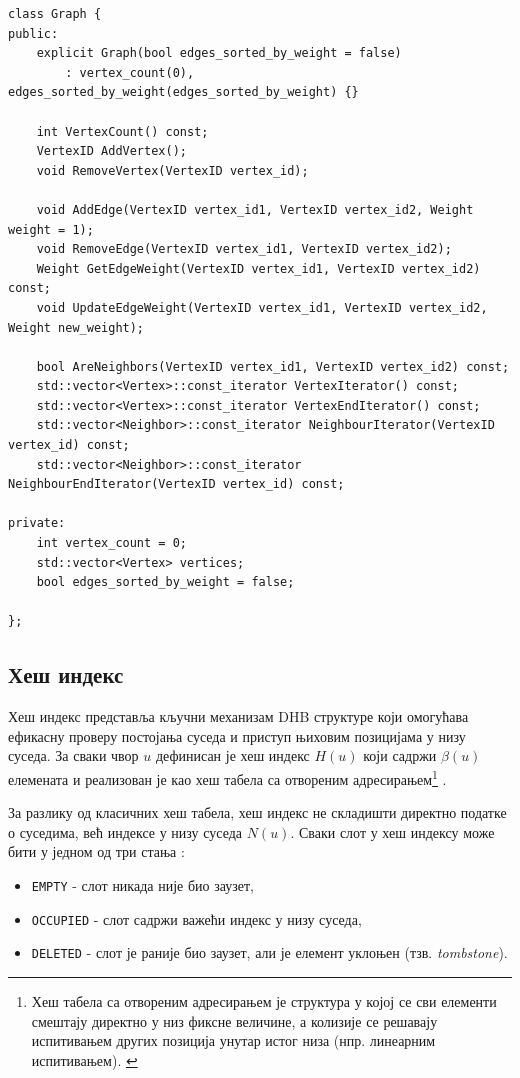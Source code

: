 \begin{lstlisting}[style=thesiscpp, caption={Интерфејс класе \texttt{Graph}}, label={lst:graph_interface}]
class Graph {
public:
    explicit Graph(bool edges_sorted_by_weight = false) 
        : vertex_count(0), edges_sorted_by_weight(edges_sorted_by_weight) {}

    int VertexCount() const;
    VertexID AddVertex();
    void RemoveVertex(VertexID vertex_id);

    void AddEdge(VertexID vertex_id1, VertexID vertex_id2, Weight weight = 1);
    void RemoveEdge(VertexID vertex_id1, VertexID vertex_id2);
    Weight GetEdgeWeight(VertexID vertex_id1, VertexID vertex_id2) const;
    void UpdateEdgeWeight(VertexID vertex_id1, VertexID vertex_id2, Weight new_weight);

    bool AreNeighbors(VertexID vertex_id1, VertexID vertex_id2) const;
    std::vector<Vertex>::const_iterator VertexIterator() const;
    std::vector<Vertex>::const_iterator VertexEndIterator() const;
    std::vector<Neighbor>::const_iterator NeighbourIterator(VertexID vertex_id) const;
    std::vector<Neighbor>::const_iterator NeighbourEndIterator(VertexID vertex_id) const;

private:
    int vertex_count = 0;
    std::vector<Vertex> vertices;
    bool edges_sorted_by_weight = false;

};
\end{lstlisting}


\subsection{Хеш индекс}


Хеш индекс представља кључни механизам DHB структуре који омогућава ефикасну проверу постојања суседа и приступ њиховим позицијама у низу суседа. За сваки чвор $u$ дефинисан је хеш индекс $H(u)$ који садржи $\beta(u)$ елемената и реализован је као хеш табела са отвореним адресирањем\footnote{Хеш табела са отвореним адресирањем је структура у којој се сви елементи смештају директно у низ фиксне величине, а колизије се решавају испитивањем других позиција унутар истог низа (нпр. линеарним испитивањем). \cite{cormenIntroductionAlgorithms2009}} \cite{vandergrinten_et_al:LIPIcs.SEA.2022.11}.

За разлику од класичних хеш табела, хеш индекс не складишти директно податке о суседима, већ индексе у низу суседа $N(u)$. Сваки слот у хеш индексу може бити у једном од три стања \cite{vandergrinten_et_al:LIPIcs.SEA.2022.11}:
\begin{itemize}
    \item \texttt{EMPTY} - слот никада није био заузет,
    \item \texttt{OCCUPIED} - слот садржи важећи индекс у низу суседа,
    \item \texttt{DELETED} - слот је раније био заузет, али је елемент уклоњен (тзв. \emph{tombstone}).
\end{itemize}

